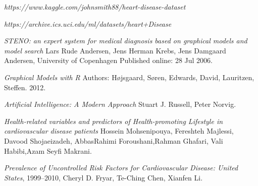 \documentclass{article}
\begin{document}
\newpage
\begin{thebibliography}{9}

\textit{https://www.kaggle.com/johnsmith88/heart-disease-dataset}

\textit{https://archive.ics.uci.edu/ml/datasets/heart+Disease}

\textit{STENO: an expert system for medical diagnosis based on graphical models and model search} Lars Rude Andersen, Jens Herman Krebs, Jens Damgaard Andersen, University of Copenhagen Published online: 28 Jul 2006.

\textit{Graphical Models with R}
Authors: Højsgaard, Søren, Edwards, David, Lauritzen, Steffen. 2012.


\textit{ Artificial Intelligence: A Modern Approach}  Stuart J. Russell, Peter Norvig.


\textit{Health-related variables and predictors of Health-promoting Lifestyle in cardiovascular disease patients} Hossein Mohsenipouya, Fereshteh Majlessi, Davood Shojaeizadeh, AbbasRahimi Foroushani,Rahman Ghafari, Vali Habibi,Azam Seyfi Makrani.

\textit{Prevalence of Uncontrolled Risk Factors for  Cardiovascular Disease: United States}, 1999–2010, Cheryl D. Fryar, Te-Ching Chen, Xianfen Li.

\end{thebibliography} 
\end{document}
